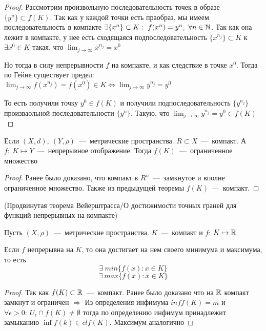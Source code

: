 \begin{proof}
    Рассмотрим произвольную последовательность точек в образе $\{y^n\} \subset f(K) $. Так как у каждой точки есть праобраз, мы имеем последовательность в компакте $\exists \{ x^n \} \subset K: \ f(x^n) = y^n, \  \forall n \in \N$. Так как она лежит в компакте, у нее есть сходящаяся  подпоследовательность $\{x^{n_{j}}\} \subset K$ к $\exists x^0 \in K$ такая, что $\lim_{j \to \infty} x^{n_{j}} = x^{0}$

    Но тогда в силу непрерывности $f$ на компакте, и как следствие в точке $x^0$. Тогда по Гейне существует предел: $\lim_{j \to \infty} f(x^{n_{j}}) = f(x^{0}) \in K \Longleftrightarrow \lim_{j \to \infty} y^{n_{j}} = y^0$

    То есть получили точку $y^0 \in f(K)$ и получили подпоследовательность $\{ y^{n_{j}} \}$ произваольной последовательности $\{ y^n \}$. Такую, что $\lim_{j \to \infty} y^{n_{j}} = y^0 \in f(K) $
    
\end{proof}


\begin{corollary}

    Если $(X, d), \ (Y, \rho)$~---~метрические пространства. $R \subset X$~---~компакт. А $f: \ K \mapsto Y$~---~непрерывное отображение. Тогда $f(K)$~---~ограниченное множество

    \begin{proof}
        Ранее было доказано, что компакт в $R^{n}$~---~замкнутое и вполне ограниченное множество. Также из предыдущей теоремы $f(K)$~---~компакт.
    \end{proof}
\end{corollary}

\begin{corollary} (Продвинутая теорема Вейерштрасса/О достижимости точных граней для функций непрерывных на компакте)

    Пусть $(X, \rho)$~---~метрические пространства. $K$~---~компакт и $f$: $K \mapsto \mathbb{R}$

    Если $f$ непрерывна на $K$, то она достигает на нем своего минимума и максимума, то есть 
    $$\exists \ min \{ f(x): x \in K \}$$
    $$\exists \ max \{ f(x): x \in K \}$$

\begin{proof}
    Так как $f(K) \subset \mathbb{R}$~---~компакт. Ранее было доказано что на $\mathbb{R}$ компакт замкнут и ограничен $\Longrightarrow$ Из определения инфимума $inf f(K) = m$ и $\forall \epsilon > 0: \ U_{\epsilon} \cap f(K) \neq \emptyset$ тогда по определению инфимум принадлежит замыканию $\inf f(k) \in cl f(K)$. Максимум аналогично
\end{proof}
\end{corollary}
